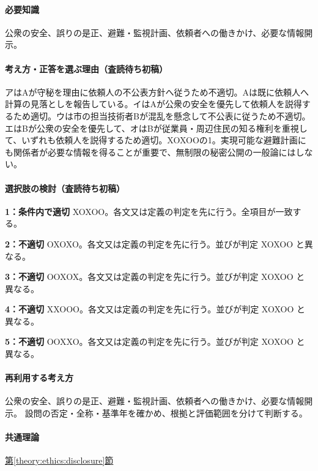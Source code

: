 \paragraph{必要知識} 公衆の安全、誤りの是正、避難・監視計画、依頼者への働きかけ、必要な情報開示。

\paragraph{考え方・正答を選ぶ理由（査読待ち初稿）} アはAが守秘を理由に依頼人の不公表方針へ従うため不適切。Aは既に依頼人へ計算の見落としを報告している。イはAが公衆の安全を優先して依頼人を説得するため適切。ウは市の担当技術者Bが混乱を懸念して不公表に従うため不適切。エはBが公衆の安全を優先して、オはBが従業員・周辺住民の知る権利を重視して、いずれも依頼人を説得するため適切。XOXOOの1。実現可能な避難計画にも関係者が必要な情報を得ることが重要で、無制限の秘密公開の一般論にはしない。

\paragraph{選択肢の検討（査読待ち初稿）}\mbox{}\par

\noindent\textbf{1：条件内で適切} XOXOO。各文又は定義の判定を先に行う。全項目が一致する。\par

\noindent\textbf{2：不適切} OXOXO。各文又は定義の判定を先に行う。並びが判定 XOXOO と異なる。\par

\noindent\textbf{3：不適切} OOXOX。各文又は定義の判定を先に行う。並びが判定 XOXOO と異なる。\par

\noindent\textbf{4：不適切} XXOOO。各文又は定義の判定を先に行う。並びが判定 XOXOO と異なる。\par

\noindent\textbf{5：不適切} OOXXO。各文又は定義の判定を先に行う。並びが判定 XOXOO と異なる。\par

\paragraph{再利用する考え方} 公衆の安全、誤りの是正、避難・監視計画、依頼者への働きかけ、必要な情報開示。 設問の否定・全称・基準年を確かめ、根拠と評価範囲を分けて判断する。

\paragraph{共通理論} \hyperref[theory:ethics:disclosure]{第\ref*{theory:ethics:disclosure}節}


